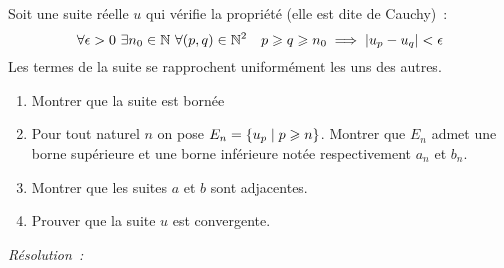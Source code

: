           \begin{exercice}
            Soit une suite réelle \(u\) qui vérifie la propriété (elle est dite 
            de Cauchy)~:
            \[ \forall \epsilon > 0 \ \exists n_0 \in \N \ \forall (p,q) \in 
            \N^2 \quad p \geqslant q \geqslant n_0 \implies \abs{u_p-u_q} < 
          \epsilon \]
          Les termes de la suite se rapprochent uniformément les uns des autres.
          \begin{enumerate}
            \item Montrer que la suite est bornée
            \item Pour tout naturel \(n\) on pose \(E_n = \left\{u_p\mathrel{}\middle|\mathrel{}p\geqslant 
              n\right\}\). Montrer que \(E_n\) admet une borne supérieure et une borne 
              inférieure notée respectivement \(a_n\) et \(b_n\).
            \item Montrer que les suites \(a\) et \(b\) sont adjacentes.
            \item Prouver que la suite \(u\) est convergente.
          \end{enumerate}
        \end{exercice}
        \emph{Résolution~:}
